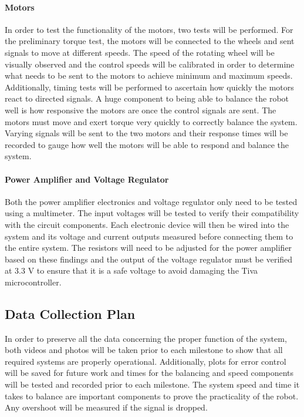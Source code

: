 \documentclass[11pt]{report}
\begin{document}
\begin{spacing}{1.5}
\paragraph*{Motors}
In order to test the functionality of the motors, two tests will be performed. For the preliminary torque test, the motors will be connected to the wheels and sent signals to move at different speeds. The speed of the rotating wheel will be visually observed and the control speeds will be calibrated in order to determine what needs to be sent to the motors to achieve minimum and maximum speeds. Additionally, timing tests will be performed to ascertain how quickly the motors react to directed signals. A huge component to being able to balance the robot well is how responsive the motors are once the control signals are sent. The motors must move and exert torque very quickly to correctly balance the system. Varying signals will be sent to the two motors and their response times will be recorded to gauge how well the motors will be able to respond and balance the system. 

\paragraph*{Power Amplifier and Voltage Regulator}
Both the power amplifier electronics and voltage regulator only need to be tested using a multimeter. The input voltages will be tested to verify their compatibility with the circuit components. Each electronic device will then be wired into the system and its voltage and current outputs measured before connecting them to the entire system. The resistors will need to be adjusted for the power amplifier based on these findings and the output of the voltage regulator must be verified at 3.3 V to ensure that it is a safe voltage to avoid damaging the Tiva microcontroller.

\subsection*{Data Collection Plan}

In order to preserve all the data concerning the proper function of the system, both videos and photos will be taken prior to each milestone to show that all required systems are properly operational. Additionally, plots for error control will be saved for future work and times for the balancing and speed components will be tested and recorded prior to each milestone. The system speed and time it takes to balance are important components to prove the practicality of the robot. Any overshoot will be measured if the signal is dropped.


\end{spacing}
\end{document}
